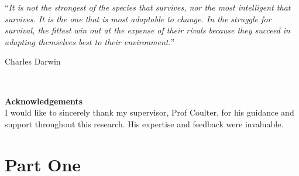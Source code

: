 \documentclass[
	12pt, %
	fleqn, %
	a4paper, %
]{LegrandOrangeBook}
\begin{document}

\thispagestyle{empty} %

\noindent\enquote{\itshape It is not the strongest of the species that survives, nor the most intelligent that survives. It is the one that is most adaptable to change. In the struggle for survival, the fittest win out at the expense of their rivals because they succeed in adapting themselves best to their environment.}\bigbreak

\hfill Charles Darwin


~\vfill %

\noindent \textbf{Acknowledgements} \\
I would like to sincerely thank my supervisor, Prof Coulter, for his guidance and support throughout this research. His expertise and feedback were invaluable. 



\pagestyle{empty} %

\tableofcontents %

\listoffigures %

\listoftables %

\pagestyle{fancy} %

\cleardoublepage %


\part{Part One}

\chapterimage{}
\chapterspaceabove{6.75cm} 
\chapterspacebelow{7.25cm}

\end{document}
